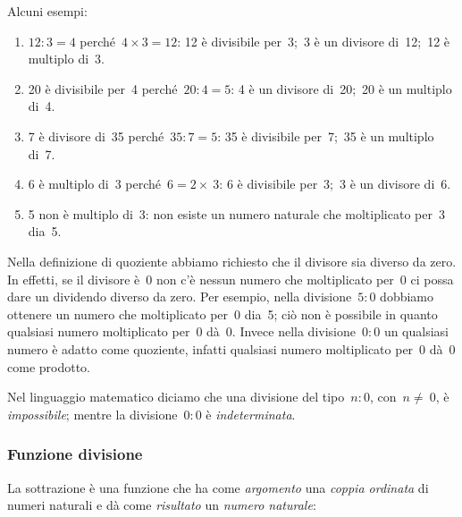 
 \begin{esempio}
Alcuni esempi:
\begin{enumerate}
\item \(12:3=4\) perché~\(4 \times 3 = 12\): 
12 è divisibile per~3;~3 è un divisore di~12;~12 è multiplo di~3.
\item 20 è divisibile per~4 perché~\(20:4=5\):
4 è un divisore di~20;~20 è un multiplo di~4.
\item 7 è divisore di~35 perché~\(35:7=5\): 
35 è divisibile per~7;~35 è un multiplo di~7.
\item 6 è multiplo di~3 perché~\(6=2\times~3\):
6 è divisibile per~3;~3 è un divisore di~6.
\item 5 non è multiplo di~3: non esiste un numero naturale che moltiplicato 
per~3 dia~5.
\end{enumerate}
\end{esempio}

\osservazione Nella definizione di quoziente abbiamo richiesto che il 
divisore sia diverso da zero. In effetti, se il divisore è~0 non c'è nessun 
numero che moltiplicato per~0 ci possa dare un dividendo diverso da zero.
Per esempio, nella divisione~\(5:0\) dobbiamo ottenere un numero che 
moltiplicato per~0 dia~5; ciò non è possibile in quanto qualsiasi numero 
moltiplicato per~0 dà~0.
Invece nella divisione~\(0:0\) un qualsiasi numero è adatto come quoziente, 
infatti qualsiasi numero moltiplicato per~0 dà~0 come prodotto.

Nel linguaggio matematico diciamo che una divisione del tipo~\(n:0\), 
con~\(n\neq~0\), è \emph{impossibile}; mentre la divisione~\(0:0\) è 
\emph{indeterminata}.

\subsubsection{Funzione divisione}

La sottrazione è una funzione che ha come \emph{argomento} una \emph{coppia 
ordinata} di numeri naturali e dà come \emph{risultato} un \emph{numero 
naturale}:

\vspace{1em}
\begin{minipage}[t]{.48\textwidth}
\begin{center}
\begin{inaccessibleblock}
\end{inaccessibleblock}
\end{center}
\end{minipage}
\hfill
\begin{minipage}[t]{.48\textwidth}
\begin{center}
\begin{inaccessibleblock}
\end{inaccessibleblock}
\end{center}
\end{minipage}

